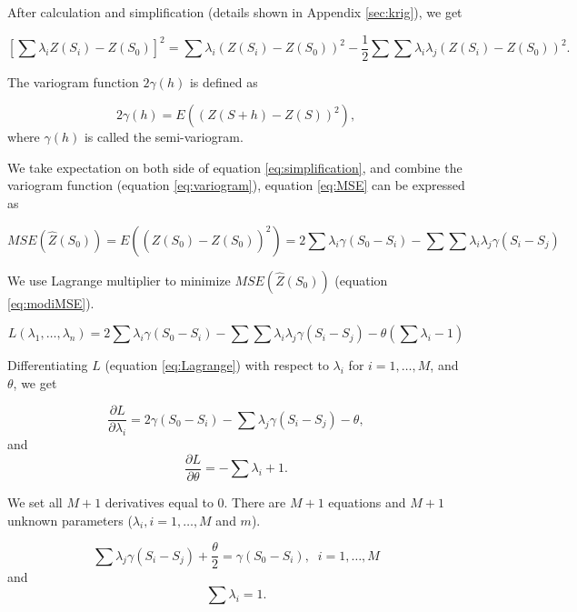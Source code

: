 \documentclass{article}\usepackage[]{graphicx}\usepackage[]{color}
\begin{document}
After calculation and simplification (details shown in Appendix \ref{sec:krig}), we get

\begin{equation}\label{eq:simplification}
\left[\sum\lambda_iZ(S_i) - Z(S_0)\right]^2 =\sum\lambda_i(Z(S_i)-Z(S_0))^2 - \frac{1}{2}\sum\sum\lambda_i\lambda_j(Z(S_i)-Z(S_0))^2.
\end{equation}


The variogram function $2\gamma(h)$ is defined as

\begin{equation}\label{eq:variogram}
2\gamma(h)=E((Z(S+h)-Z(S))^2),
\end{equation} 
where $\gamma(h)$ is called the semi-variogram.


We take expectation on both side of equation \ref{eq:simplification},  and combine the variogram function (equation \ref{eq:variogram}), equation \ref{eq:MSE} can be expressed as

\begin{equation}\label{eq:modiMSE}
MSE(\widehat{Z}(S_0))=E((Z(S_0)-\widehat{Z}(S_0))^2) = 2\sum\lambda_i\gamma(S_0-S_i) - \sum\sum\lambda_i\lambda_j\gamma(S_i-S_j)
\end{equation}

We use Lagrange multiplier to minimize $MSE(\widehat{Z}(S_0))$ (equation \ref{eq:modiMSE}).  

\begin{equation}\label{eq:Lagrange}
L(\lambda_1,\dots,\lambda_n) = 2\sum\lambda_i\gamma(S_0-S_i) - \sum\sum\lambda_i\lambda_j\gamma(S_i-S_j) - \theta\left(\sum\lambda_i-1\right)
\end{equation}

Differentiating $L$ (equation \ref{eq:Lagrange}) with respect to $\lambda_i$ for $i=1,\dots,M$, and $\theta$, we get

\begin{equation}
\frac{\partial L}{\partial \lambda_i} = 2\gamma(S_0-S_i) - \sum\lambda_j\gamma(S_i-S_j) - \theta,
\end{equation}
and
\begin{equation}
\frac{\partial L}{\partial \theta} =  -\sum\lambda_i +1.
\end{equation}

We set all $M+1$ derivatives equal to 0. There are $M+1$ equations and $M+1$ unknown parameters ($\lambda_i, i=1,\dots,M$ and $m$). 

\begin{equation}
\sum\lambda_j\gamma(S_i-S_j) + \frac{\theta}{2} =\gamma(S_0-S_i),\;\;i=1,\dots,M
\end{equation}
and
\begin{equation}
\sum\lambda_i = 1.
\end{equation}
\end{document}
